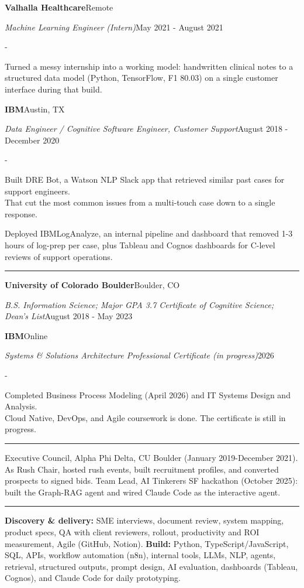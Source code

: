 \documentclass[10pt,letterpaper]{article}
\newenvironment{cvitems}{%
  \begin{list}{-}{%
    \setlength{\leftmargin}{12pt}%
    \setlength{\itemsep}{1.2pt}%
    \setlength{\parsep}{0pt}%
    \setlength{\topsep}{1.5pt}%
    \setlength{\partopsep}{0pt}%
    \setlength{\labelwidth}{6pt}%
    \setlength{\labelsep}{6pt}%
    \setlength{\itemindent}{0pt}%
  }%
}{\end{list}}
\newcommand{\cvsection}[1]{%
  \vspace{7pt}%
  \noindent{\bfseries\fontsize{11pt}{13pt}\selectfont\MakeUppercase{#1}}\par
  \vspace{1pt}%
  \noindent\rule{\textwidth}{0.4pt}\par
  \vspace{4pt}%
}
\newcommand{\cventryhead}[4]{%
  \noindent\textbf{#1}\hfill#2\par
  \vspace{0.5pt}%
  \noindent\textit{#3}\hfill#4\par
}
\newcommand{\cveduhead}[4]{%
  \noindent\textbf{#1}\hfill#2\par
  \vspace{0.5pt}%
  \noindent\textit{#3}\hfill#4\par
}
\begin{document}
\vspace{3pt}
\cventryhead{Valhalla Healthcare}{Remote}
{Machine Learning Engineer (Intern)}{May 2021 - August 2021}
\begin{cvitems}
  \item Turned a messy internship into a working model: handwritten clinical notes to a structured data model (Python, TensorFlow, F1 80.03) on a single customer interface during that build.
\end{cvitems}

\vspace{3pt}
\cventryhead{IBM}{Austin, TX}
{Data Engineer / Cognitive Software Engineer, Customer Support}{August 2018 - December 2020}
\begin{cvitems}
  \item Built DRE Bot, a Watson NLP Slack app that retrieved similar past cases for support engineers.\\
  That cut the most common issues from a multi-touch case down to a single response.
  \item Deployed IBMLogAnalyze, an internal pipeline and dashboard that removed 1-3 hours of log-prep per case, plus Tableau and Cognos dashboards for C-level reviews of support operations.
\end{cvitems}

\cvsection{Education}

\cveduhead{University of Colorado Boulder}{Boulder, CO}
{B.S. Information Science; Major GPA 3.7 \textbar{} Certificate of Cognitive Science; Dean's List}{August 2018 - May 2023}

\vspace{3pt}
\cveduhead{IBM}{Online}
{Systems \& Solutions Architecture Professional Certificate (in progress)}{2026}
\begin{cvitems}
  \item Completed Business Process Modeling (April 2026) and IT Systems Design and Analysis.\\
  Cloud Native, DevOps, and Agile coursework is done. The certificate is still in progress.
\end{cvitems}

\cvsection{Leadership}

{\raggedright
\noindent Executive Council, Alpha Phi Delta, CU Boulder (January 2019-December 2021). As Rush Chair, hosted rush events, built recruitment profiles, and converted prospects to signed bids. Team Lead, AI Tinkerers SF hackathon (October 2025): built the Graph-RAG agent and wired Claude Code as the interactive agent.\par
}

\cvsection{Skills}

{\raggedright
\noindent\textbf{Discovery \& delivery:} SME interviews, document review, system mapping, product specs, QA with client reviewers, rollout, productivity and ROI measurement, Agile (GitHub, Notion). \textbf{Build:} Python, TypeScript/JavaScript, SQL, APIs, workflow automation (n8n), internal tools, LLMs, NLP, agents, retrieval, structured outputs, prompt design, AI evaluation, dashboards (Tableau, Cognos), and Claude Code for daily prototyping.\par
}
\end{document}
